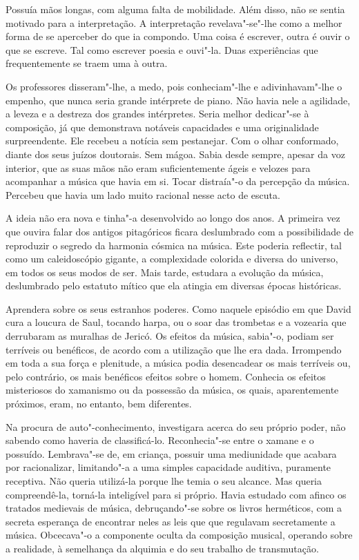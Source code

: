 Possuía mãos longas, com alguma falta de mobilidade. Além disso, não se
sentia motivado para a interpretação. A interpretação revelava"-se"-lhe
como a melhor forma de se aperceber do que ia compondo. Uma coisa é
escrever, outra é ouvir o que se escreve. Tal como escrever poesia e
ouvi"-la. Duas experiências que frequentemente se traem uma à outra.

Os professores disseram"-lhe, a medo, pois conheciam"-lhe e
adivinhavam"-lhe o empenho, que nunca seria grande intérprete de piano.
Não havia nele a agilidade, a leveza e a destreza dos grandes
intérpretes. Seria melhor dedicar"-se à composição, já que demonstrava
notáveis capacidades e uma originalidade surpreendente. Ele recebeu a
notícia sem pestanejar. Com o olhar conformado, diante dos seus juízos
doutorais. Sem mágoa. Sabia desde sempre, apesar da voz interior, que as
suas mãos não eram suficientemente ágeis e velozes para acompanhar a
música que havia em si. Tocar distraía"-o da percepção da música.
Percebeu que havia um lado muito racional nesse acto de escuta.

A ideia não era nova e tinha"-a desenvolvido ao longo dos anos. A
primeira vez que ouvira falar dos antigos pitagóricos ficara deslumbrado
com a possibilidade de reproduzir o segredo da harmonia cósmica na
música. Este poderia reflectir, tal como um caleidoscópio gigante, a
complexidade colorida e diversa do universo, em todos os seus modos de
ser. Mais tarde, estudara a evolução da música, deslumbrado pelo
estatuto mítico que ela atingia em diversas épocas históricas.

Aprendera sobre os seus estranhos poderes. Como naquele episódio em que
David cura a loucura de Saul, tocando harpa, ou o soar das trombetas e a
vozearia que derrubaram as muralhas de Jericó. Os efeitos da música,
sabia"-o, podiam ser terríveis ou benéficos, de acordo com a utilização
que lhe era dada. Irrompendo em toda a sua força e plenitude, a música
podia desencadear os mais terríveis ou, pelo contrário, os mais
benéficos efeitos sobre o homem. Conhecia os efeitos misteriosos do
xamanismo ou da possessão da música, os quais, aparentemente próximos,
eram, no entanto, bem diferentes.

Na procura de auto"-conhecimento, investigara acerca do seu próprio
poder, não sabendo como haveria de classificá-lo. Reconhecia"-se entre o
xamane e o possuído. Lembrava"-se de, em criança, possuir uma mediunidade
que acabara por racionalizar, limitando"-a a uma simples capacidade
auditiva, puramente receptiva. Não queria utilizá-la porque lhe temia o
seu alcance. Mas queria compreendê-la, torná-la inteligível para si
próprio. Havia estudado com afinco os tratados medievais de música,
debruçando"-se sobre os livros herméticos, com a secreta esperança de
encontrar neles as leis que que regulavam secretamente a música.
Obcecava"-o a componente oculta da composição musical, operando sobre a
realidade, à semelhança da alquimia e do seu trabalho de transmutação.

